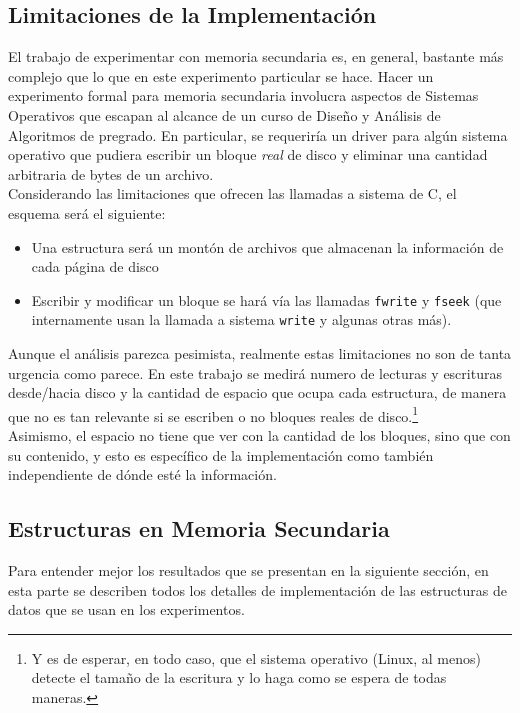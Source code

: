 \documentclass[12pt,letterpaper]{report}
\begin{document}
\subsection{Limitaciones de la Implementación}

El trabajo de experimentar con memoria secundaria es, en general, bastante más complejo que lo que en este experimento particular se hace. Hacer un experimento formal para memoria secundaria involucra aspectos de Sistemas Operativos que escapan al alcance de un curso de Diseño y Análisis de Algoritmos de pregrado. En particular, se requeriría un driver para algún sistema operativo que pudiera escribir un bloque \emph{real} de disco y eliminar una cantidad arbitraria de bytes de un archivo.\\

Considerando las limitaciones que ofrecen las llamadas a sistema de C, el esquema será el siguiente:

\begin{itemize}
\item Una estructura será un montón de archivos que almacenan la información de cada página de disco
\item Escribir y modificar un bloque se hará vía las llamadas \texttt{fwrite} y \texttt{fseek} (que internamente usan la llamada a sistema \texttt{write} y algunas otras más).
\end{itemize}

Aunque el análisis parezca pesimista, realmente estas limitaciones no son de tanta urgencia como parece. En este trabajo se medirá numero de lecturas y escrituras desde/hacia disco y la cantidad de espacio que ocupa cada estructura, de manera que no es tan relevante si se escriben o no bloques reales de disco.\footnote{Y es de esperar, en todo caso, que el sistema operativo (Linux, al menos) detecte el tamaño de la escritura y lo haga como se espera de todas maneras.}\\

Asimismo, el espacio no tiene que ver con la cantidad de los bloques, sino que con su contenido, y esto es específico de la implementación como también independiente de dónde esté la información.


\subsection{Estructuras en Memoria Secundaria}

Para entender mejor los resultados que se presentan en la siguiente sección, en esta parte se describen todos los detalles de implementación de las estructuras de datos que se usan en los experimentos.\\
\end{document}
